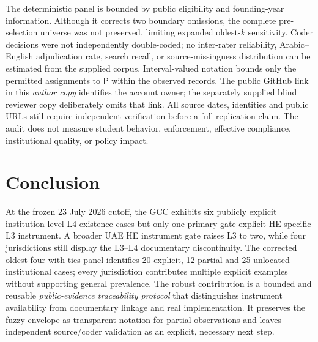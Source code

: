 \documentclass[conference,letterpaper]{IEEEtran}
\newcommand{\stP}{\textsf{P}}
\begin{document}
The deterministic panel is bounded by public eligibility and founding-year information. Although it corrects two boundary omissions, the complete pre-selection universe was not preserved, limiting expanded oldest-$k$ sensitivity. Coder decisions were not independently double-coded; no inter-rater reliability, Arabic--English adjudication rate, search recall, or source-missingness distribution can be estimated from the supplied corpus. Interval-valued notation bounds only the permitted assignments to $\stP$ within the observed records. The public GitHub link in this \emph{author copy} identifies the account owner; the separately supplied blind reviewer copy deliberately omits that link. All source dates, identities and public URLs still require independent verification before a full-replication claim. The audit does not measure student behavior, enforcement, effective compliance, institutional quality, or policy impact.

\section{Conclusion}
At the frozen 23 July 2026 cutoff, the GCC exhibits six publicly explicit institution-level L4 existence cases but only one primary-gate explicit HE-specific L3 instrument. A broader UAE HE instrument gate raises L3 to two, while four jurisdictions still display the L3--L4 documentary discontinuity. The corrected oldest-four-with-ties panel identifies 20 explicit, 12 partial and 25 unlocated institutional cases; every jurisdiction contributes multiple explicit examples without supporting general prevalence. The robust contribution is a bounded and reusable \emph{public-evidence traceability protocol} that distinguishes instrument availability from documentary linkage and real implementation. It preserves the fuzzy envelope as transparent notation for partial observations and leaves independent source/coder validation as an explicit, necessary next step.
\end{document}
